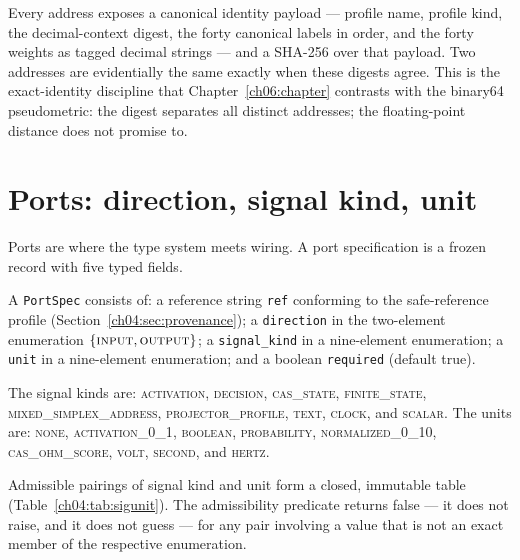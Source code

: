 \begin{remark}
Every address exposes a canonical identity payload --- profile name,
profile kind, the decimal-context digest, the forty canonical labels in
order, and the forty weights as tagged decimal strings --- and a SHA-256
over that payload. Two addresses are evidentially the same exactly when
these digests agree. This is the exact-identity discipline that
Chapter~\ref{ch06:chapter} contrasts with the binary64 pseudometric: the
digest separates all distinct addresses; the floating-point distance does
not promise to.
\end{remark}

\section{Ports: direction, signal kind, unit}\label{ch04:sec:ports}

Ports are where the type system meets wiring. A port specification is a
frozen record with five typed fields.

\begin{definition}\label{ch04:def:portspec}
A \texttt{PortSpec} consists of: a reference string \texttt{ref} conforming
to the safe-reference profile (Section~\ref{ch04:sec:provenance}); a
\texttt{direction} in the two-element enumeration
$\{\textsc{input}, \textsc{output}\}$; a \texttt{signal\_kind} in a
nine-element enumeration; a \texttt{unit} in a nine-element enumeration;
and a boolean \texttt{required} (default true).
\end{definition}

The signal kinds are: \textsc{activation}, \textsc{decision},
\textsc{cas\_state}, \textsc{finite\_state},
\textsc{mixed\_simplex\_address}, \textsc{projector\_profile},
\textsc{text}, \textsc{clock}, and \textsc{scalar}. The units are:
\textsc{none}, \textsc{activation\_0\_1}, \textsc{boolean},
\textsc{probability}, \textsc{normalized\_0\_10},
\textsc{cas\_ohm\_score}, \textsc{volt}, \textsc{second}, and
\textsc{hertz}.

\begin{ruleenv}\label{ch04:rule:sigunit}
Admissible pairings of signal kind and unit form a closed, immutable table
(Table~\ref{ch04:tab:sigunit}). The admissibility predicate returns
false --- it does not raise, and it does not guess --- for any pair
involving a value that is not an exact member of the respective
enumeration.
\end{ruleenv}

